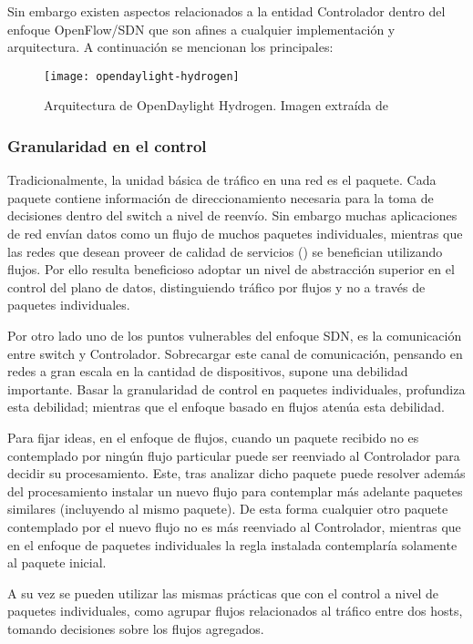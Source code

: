 Sin embargo existen aspectos relacionados a la entidad Controlador dentro del enfoque OpenFlow/SDN que son afines a cualquier implementaci\'on y arquitectura. A continuaci\'on se mencionan los principales:
  
\begin{figure}[h!] 
\centering    
\texttt{[image: opendaylight-hydrogen]}
\caption[Arquitectura de OpenDaylight Hydrogen]{Arquitectura de OpenDaylight Hydrogen. Imagen extraída de \cite{OpenDaylightArch}}
\label{fig:OpenDayLightHydrogen}
\end{figure}

\newpage
\subsubsection{Granularidad en el control}
Tradicionalmente, la unidad básica de tráfico en una red es el paquete. Cada paquete contiene información de direccionamiento necesaria para la toma de decisiones dentro del switch a nivel de reenvío. Sin embargo muchas aplicaciones de red envían datos como un flujo de muchos paquetes individuales, mientras que las redes que desean proveer de calidad de servicios () se benefician utilizando flujos. Por ello resulta beneficioso adoptar un nivel de abstracción superior en el control del plano de datos, distinguiendo tr\'afico por flujos y no a través de paquetes individuales.
 
Por otro lado uno de los puntos vulnerables del enfoque SDN, es la comunicación entre switch y Controlador. Sobrecargar este canal de comunicación, pensando en redes a gran escala en la cantidad de dispositivos, supone una debilidad importante. Basar la granularidad de control en paquetes individuales, profundiza esta debilidad; mientras que el enfoque basado en flujos atenúa esta debilidad. 

Para fijar ideas, en el enfoque de flujos, cuando un paquete recibido no es contemplado por ning\'un flujo particular puede ser reenviado al Controlador para decidir su procesamiento. Este, tras analizar dicho paquete puede resolver adem\'as del procesamiento instalar un nuevo flujo para contemplar m\'as adelante paquetes similares (incluyendo al mismo paquete). De esta forma cualquier otro paquete contemplado por el nuevo flujo no es m\'as reenviado al Controlador, mientras que en el enfoque de paquetes individuales la regla instalada contemplar\'ia solamente al paquete inicial.

A su vez se pueden utilizar las mismas prácticas que con el control a nivel
de paquetes individuales, como agrupar flujos relacionados al tráfico entre dos hosts, tomando
decisiones sobre los flujos agregados. 


